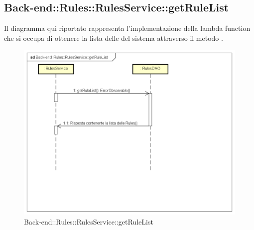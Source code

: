 \subsection{Back-end::Rules::RulesService::getRuleList}
Il diagramma qui riportato rappresenta l'implementazione della lambda function che si occupa di ottenere la lista delle  del sistema attraverso il metodo .
\begin{figure}[h] \centering \includegraphics[width=\textwidth,height=\textheight,keepaspectratio]{images/diagrams/back-end/Ufficial_Backend/Back-endRulesRulesServicegetRuleList.png} 	\caption{Back-end::Rules::RulesService::getRuleList}
\end{figure} 
\newpage


